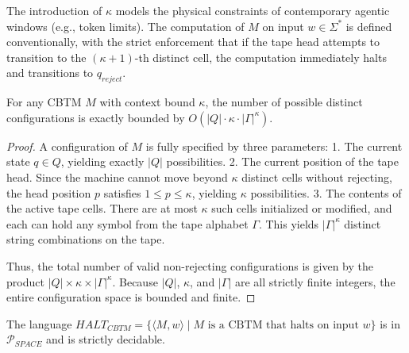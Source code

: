 The introduction of $\kappa$ models the physical constraints of contemporary agentic windows (e.g., token limits). The computation of $M$ on input $w \in \Sigma^*$ is defined conventionally, with the strict enforcement that if the tape head attempts to transition to the $(\kappa+1)$-th distinct cell, the computation immediately halts and transitions to $q_{reject}$.

\begin{lemma}
\label{lem:finite_config}
For any CBTM $M$ with context bound $\kappa$, the number of possible distinct configurations is exactly bounded by $O(|Q| \cdot \kappa \cdot |\Gamma|^\kappa)$.
\end{lemma}

\begin{proof}
A configuration of $M$ is fully specified by three parameters:
1. The current state $q \in Q$, yielding exactly $|Q|$ possibilities.
2. The current position of the tape head. Since the machine cannot move beyond $\kappa$ distinct cells without rejecting, the head position $p$ satisfies $1 \le p \le \kappa$, yielding $\kappa$ possibilities.
3. The contents of the active tape cells. There are at most $\kappa$ such cells initialized or modified, and each can hold any symbol from the tape alphabet $\Gamma$. This yields $|\Gamma|^\kappa$ distinct string combinations on the tape.

Thus, the total number of valid non-rejecting configurations is given by the product $|Q| \times \kappa \times |\Gamma|^\kappa$. Because $|Q|$, $\kappa$, and $|\Gamma|$ are all strictly finite integers, the entire configuration space is bounded and finite.
\end{proof}

\begin{theorem}
\label{thm:cbtm_halting}
The language $HALT_{CBTM} = \{ \langle M, w \rangle \mid M \text{ is a CBTM that halts on input } w \}$ is in $\mathcal{P}_{SPACE}$ and is strictly decidable.
\end{theorem}

